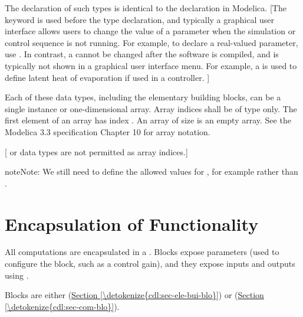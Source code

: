 \documentclass[letterpaper,10pt, openany,english]{sphinxmanual}
\begin{document}
The declaration of such types is identical to the declaration
in Modelica.
{[}The keyword  is used
before the type declaration, and typically a graphical user interface
allows users to change the value of a parameter when the simulation
or control sequence is not running.
For example, to declare a real-valued parameter,
use .
In contrast, a  cannot be changed after the software is
compiled, and is typically not shown in a graphical user interface menu.
For example, a  is used to define latent heat of evaporation
if used in a controller.
{]}

Each of these data types, including the elementary building blocks,
can be a single instance or one-dimensional array.
Array indices shall be of type  only.
The first element of an array has index .
An array of size  is an empty array.
See the Modelica 3.3 specification Chapter 10 for array notation.

{[} or  data types are not permitted as array indices.{]}

\begin{sphinxadmonition}{note}{Note:}
We still need to define the allowed values for , for example
 rather than .
\end{sphinxadmonition}


\section{Encapsulation of Functionality}
\label{\detokenize{cdl:encapsulation-of-functionality}}\label{\detokenize{cdl:sec-enc-block}}
All computations are encapsulated in a .
Blocks expose parameters (used to configure
the block, such as a control gain), and they
expose inputs and outputs using {\hyperref[\detokenize{cdl:connectors}]{}}.

Blocks are either  (\hyperref[\detokenize{cdl:sec-ele-bui-blo}]{Section \ref{\detokenize{cdl:sec-ele-bui-blo}}})
or  (\hyperref[\detokenize{cdl:sec-com-blo}]{Section \ref{\detokenize{cdl:sec-com-blo}}}).
\end{document}
